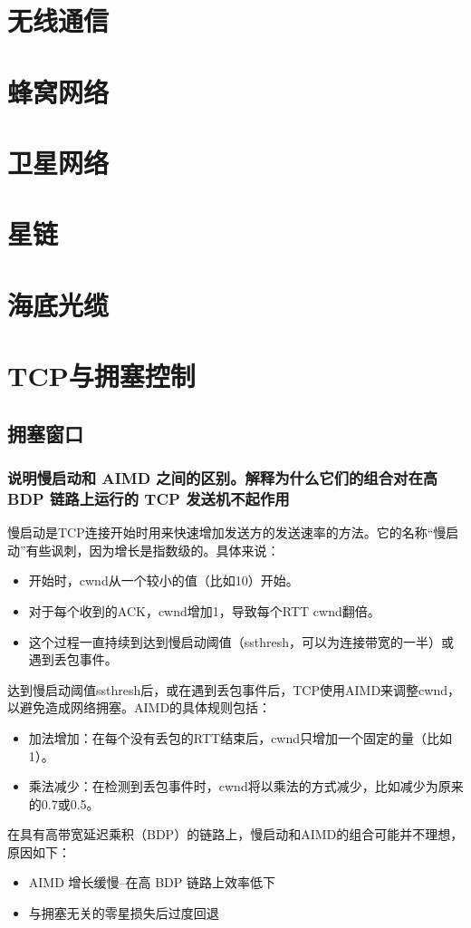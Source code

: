 \chapter{无线通信}

\chapter{蜂窝网络}

\chapter{卫星网络}

\chapter{星链}

\chapter{海底光缆}

\chapter{TCP与拥塞控制}

\section{拥塞窗口}

\subsection{说明慢启动和 AIMD 之间的区别。解释为什么它们的组合对在高 BDP 链路上运行的 TCP 发送机不起作用}

慢启动是TCP连接开始时用来快速增加发送方的发送速率的方法。它的名称“慢启动”有些讽刺，因为增长是指数级的。具体来说：

\begin{itemize}
	\item 开始时，cwnd从一个较小的值（比如10）开始。
	\item 对于每个收到的ACK，cwnd增加1，导致每个RTT cwnd翻倍。
	\item 这个过程一直持续到达到慢启动阈值（ssthresh，可以为连接带宽的一半）或遇到丢包事件。
\end{itemize}

达到慢启动阈值ssthresh后，或在遇到丢包事件后，TCP使用AIMD来调整cwnd，以避免造成网络拥塞。AIMD的具体规则包括：

\begin{itemize}
	\item 加法增加：在每个没有丢包的RTT结束后，cwnd只增加一个固定的量（比如1）。

	\item 乘法减少：在检测到丢包事件时，cwnd将以乘法的方式减少，比如减少为原来的0.7或0.5。
\end{itemize}


在具有高带宽延迟乘积（BDP）的链路上，慢启动和AIMD的组合可能并不理想，原因如下：

\begin{itemize}
	\item AIMD 增长缓慢--在高 BDP 链路上效率低下
	\item 与拥塞无关的零星损失后过度回退
\end{itemize}